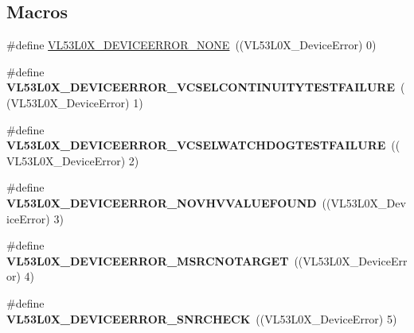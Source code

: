 \subsection*{Macros}
\begin{DoxyCompactItemize}
\item 
\#define \hyperlink{group__VL53L0X__DeviceError__group_gada232800eb73d4e8ef6fb2ca506f7030}{V\+L53\+L0\+X\+\_\+\+D\+E\+V\+I\+C\+E\+E\+R\+R\+O\+R\+\_\+\+N\+O\+NE}~((V\+L53\+L0\+X\+\_\+\+Device\+Error) 0)
\item 
\mbox{\label{group__VL53L0X__DeviceError__group_ga990b58d47de775fafe1d03e28498ccd8}} 
\#define {\bfseries V\+L53\+L0\+X\+\_\+\+D\+E\+V\+I\+C\+E\+E\+R\+R\+O\+R\+\_\+\+V\+C\+S\+E\+L\+C\+O\+N\+T\+I\+N\+U\+I\+T\+Y\+T\+E\+S\+T\+F\+A\+I\+L\+U\+RE}~((V\+L53\+L0\+X\+\_\+\+Device\+Error) 1)
\item 
\mbox{\label{group__VL53L0X__DeviceError__group_ga59380b9d2d9314d1664f95f043408034}} 
\#define {\bfseries V\+L53\+L0\+X\+\_\+\+D\+E\+V\+I\+C\+E\+E\+R\+R\+O\+R\+\_\+\+V\+C\+S\+E\+L\+W\+A\+T\+C\+H\+D\+O\+G\+T\+E\+S\+T\+F\+A\+I\+L\+U\+RE}~((V\+L53\+L0\+X\+\_\+\+Device\+Error) 2)
\item 
\mbox{\label{group__VL53L0X__DeviceError__group_ga8da0ee3227f4ec72ff2927c7cdff8cfe}} 
\#define {\bfseries V\+L53\+L0\+X\+\_\+\+D\+E\+V\+I\+C\+E\+E\+R\+R\+O\+R\+\_\+\+N\+O\+V\+H\+V\+V\+A\+L\+U\+E\+F\+O\+U\+ND}~((V\+L53\+L0\+X\+\_\+\+Device\+Error) 3)
\item 
\mbox{\label{group__VL53L0X__DeviceError__group_gabfceff1bf6e945a8647c6e980331925c}} 
\#define {\bfseries V\+L53\+L0\+X\+\_\+\+D\+E\+V\+I\+C\+E\+E\+R\+R\+O\+R\+\_\+\+M\+S\+R\+C\+N\+O\+T\+A\+R\+G\+ET}~((V\+L53\+L0\+X\+\_\+\+Device\+Error) 4)
\item 
\mbox{\label{group__VL53L0X__DeviceError__group_ga6864aeef5af11cb8b987ca62010643b6}} 
\#define {\bfseries V\+L53\+L0\+X\+\_\+\+D\+E\+V\+I\+C\+E\+E\+R\+R\+O\+R\+\_\+\+S\+N\+R\+C\+H\+E\+CK}~((V\+L53\+L0\+X\+\_\+\+Device\+Error) 5)
\item 
\mbox{\label{group__VL53L0X__DeviceError__group_gaec4009280b2031a81f49131557838001}} 

\end{DoxyCompactItemize}
